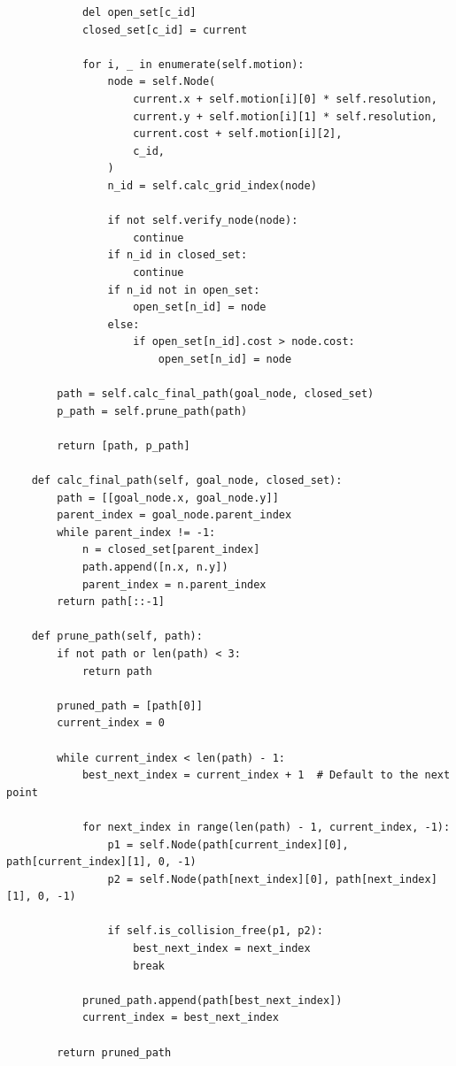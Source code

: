 \begin{lstlisting}
            del open_set[c_id]
            closed_set[c_id] = current

            for i, _ in enumerate(self.motion):
                node = self.Node(
                    current.x + self.motion[i][0] * self.resolution,
                    current.y + self.motion[i][1] * self.resolution,
                    current.cost + self.motion[i][2],
                    c_id,
                )
                n_id = self.calc_grid_index(node)

                if not self.verify_node(node):
                    continue
                if n_id in closed_set:
                    continue
                if n_id not in open_set:
                    open_set[n_id] = node
                else:
                    if open_set[n_id].cost > node.cost:
                        open_set[n_id] = node

        path = self.calc_final_path(goal_node, closed_set)
        p_path = self.prune_path(path)
        
        return [path, p_path]

    def calc_final_path(self, goal_node, closed_set):
        path = [[goal_node.x, goal_node.y]]
        parent_index = goal_node.parent_index
        while parent_index != -1:
            n = closed_set[parent_index]
            path.append([n.x, n.y])
            parent_index = n.parent_index
        return path[::-1]

    def prune_path(self, path):
        if not path or len(path) < 3:
            return path
        
        pruned_path = [path[0]]
        current_index = 0

        while current_index < len(path) - 1:
            best_next_index = current_index + 1  # Default to the next point
            
            for next_index in range(len(path) - 1, current_index, -1):
                p1 = self.Node(path[current_index][0], path[current_index][1], 0, -1)
                p2 = self.Node(path[next_index][0], path[next_index][1], 0, -1)
                
                if self.is_collision_free(p1, p2):
                    best_next_index = next_index
                    break
            
            pruned_path.append(path[best_next_index])
            current_index = best_next_index
                    
        return pruned_path
    

\end{lstlisting}
